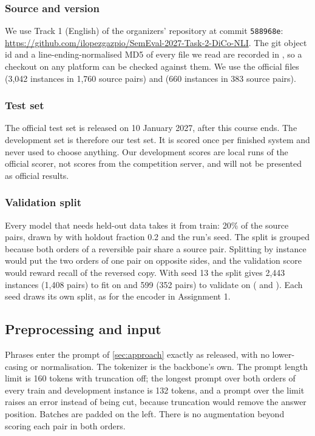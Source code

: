 \subsubsection*{Source and version}
We use Track 1 (English) of the organizers' repository at commit \texttt{588968e}:\\ \url{https://github.com/ilopezgazpio/SemEval-2027-Task-2-DiCo-NLI}. The git object id and a line-ending-normalised MD5 of every file we read are recorded in , so a checkout on any platform can be checked against them. We use the official files  (3{,}042 instances in 1{,}760 source pairs) and  (660 instances in 383 source pairs).

\subsubsection*{Test set}
The official test set is released on 10 January 2027, after this course ends. The development set is therefore our test set. It is scored once per finished system and never used to choose anything. Our development scores are local runs of the official scorer, not scores from the competition server, and will not be presented as official results.

\subsubsection*{Validation split}
Every model that needs held-out data takes it from train: 20\% of the source pairs, drawn by  with holdout fraction 0.2 and the run's seed. The split is grouped because both orders of a reversible pair share a source pair. Splitting by instance would put the two orders of one pair on opposite sides, and the validation score would reward recall of the reversed copy. With seed 13 the split gives 2{,}443 instances (1{,}408 pairs) to fit on and 599 (352 pairs) to validate on ( and ). Each seed draws its own split, as for the encoder in Assignment 1.

\subsection{Preprocessing and input}
\label{sec:protocol-input}

Phrases enter the prompt of \cref{sec:approach} exactly as released, with no lower-casing or normalisation. The tokenizer is the backbone's own. The prompt length limit is 160 tokens with truncation off; the longest prompt over both orders of every train and development instance is 132 tokens, and a prompt over the limit raises an error instead of being cut, because truncation would remove the answer position. Batches are padded on the left. There is no augmentation beyond scoring each pair in both orders.

